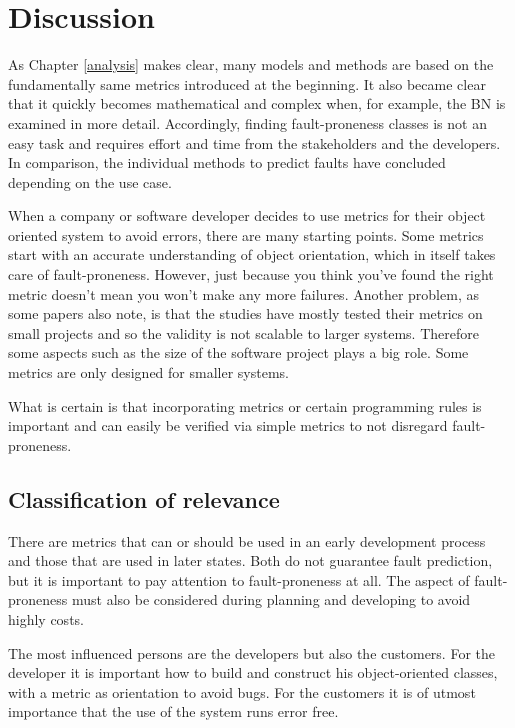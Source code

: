 \section{Discussion}\label{discussion}

As Chapter \ref{analysis} makes clear, many models and methods are based on the fundamentally same metrics introduced at the beginning. It also became clear that it quickly becomes mathematical and complex when, for example, the BN is examined in more detail. Accordingly, finding fault-proneness classes is not an easy task and requires effort and time from the stakeholders and the developers.
In comparison, the individual methods to predict faults have concluded depending on the use case.

When a company or software developer decides to use metrics for their object oriented system to avoid errors, there are many starting points. Some metrics start with an accurate understanding of object orientation, which in itself takes care of fault-proneness. However, just because you think you've found the right metric doesn't mean you won't make any more failures. Another problem, as some papers also note, is that the studies have mostly tested their metrics on small projects and so the validity is not scalable to larger systems. Therefore some aspects such as the size of the software project plays a big role. Some metrics are only designed for smaller systems.

What is certain is that incorporating metrics or certain programming rules is important and can easily be verified via simple metrics to not disregard fault-proneness.


\subsection{Classification of relevance}

There are metrics that can or should be used in an early development process and those that are used in later states. Both do not guarantee fault prediction, but it is important to pay attention to fault-proneness at all.
The aspect of fault-proneness must also be considered during planning and developing to avoid highly costs.

The most influenced persons are the developers but also the customers.
For the developer it is important how to build and construct his object-oriented classes, with a metric as orientation to avoid bugs. For the customers it is of utmost importance that the use of the system runs error free. 

